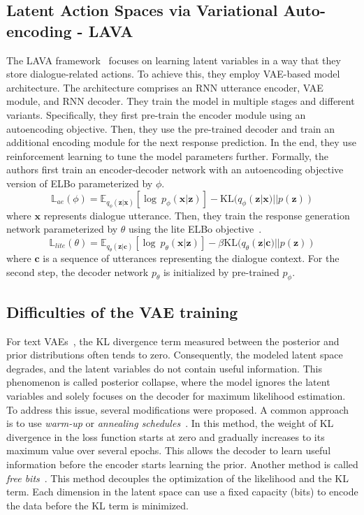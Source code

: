 \subsection{Latent Action Spaces via Variational Auto-encoding - LAVA}
\label{02:sec:lava}
The LAVA framework~\cite{lubis-etal-2020-lava} focuses on learning latent variables in a way that they store dialogue-related actions.
To achieve this, they employ VAE-based model architecture.
The architecture comprises an RNN utterance encoder, VAE module, and RNN decoder.
They train the model in multiple stages and different variants.
Specifically, they first pre-train the encoder module using an autoencoding objective.
Then, they use the pre-trained decoder and train an additional encoding module for the next response prediction.
In the end, they use reinforcement learning to tune the model parameters further.
Formally, the authors first train an encoder-decoder network with an autoencoding objective version of ELBo parameterized by $\phi$.
\begin{equation}
    \mathbb{L}_{ae}(\phi) = \mathbb{E}_{q_{\phi}(\mathbf{z}|\mathbf{x})}[\log~p_{\phi}(\mathbf{x}|\mathbf{z})] -\mathrm{KL}(q_{\phi}(\mathbf{z}|\mathbf{x})||p(\mathbf{z}))
\end{equation}
where $\mathbf{x}$ represents dialogue utterance.
Then, they train the response generation network parameterized by $\theta$ using the lite ELBo objective~\cite{lubis-etal-2020-lava}.
\begin{equation}
    \mathbb{L}_{lite}(\theta) = \mathbb{E}_{q_{\theta}(\mathbf{z}|\mathbf{c})}[\log~p_{\theta}(\mathbf{x}|\mathbf{z})] - \beta\mathrm{KL}(q_{\theta}(\mathbf{z}|\mathbf{c})||p(\mathbf{z}))
\end{equation}
where $\mathbf{c}$ is a sequence of utterances representing the dialogue context.
For the second step, the decoder network $p_{\theta}$ is initialized by pre-trained $p_{\phi}$.

\subsection{Difficulties of the VAE training}
\label{background:vae-problems}
For text VAEs~\citep{bowman-etal-2016-generating}, the KL divergence term measured between the posterior and prior distributions often tends to zero.
Consequently, the modeled latent space degrades, and the latent variables do not contain useful information.
This phenomenon is called posterior collapse, where the model ignores the latent variables and solely focuses on the decoder for maximum likelihood estimation.
To address this issue, several modifications were proposed.
A common approach is to use \emph{warm-up} or \emph{annealing schedules}~\cite {fu-etal-2019-cyclical}.
In this method, the weight of KL divergence in the loss function starts at zero and gradually increases to its maximum value over several epochs.
This allows the decoder to learn useful information before the encoder starts learning the prior.
Another method is called \emph{free bits}~\cite{li2019surprisingly}.
This method decouples the optimization of the likelihood and the KL term.
Each dimension in the latent space can use a fixed capacity (bits) to encode the data before the KL term is minimized.

